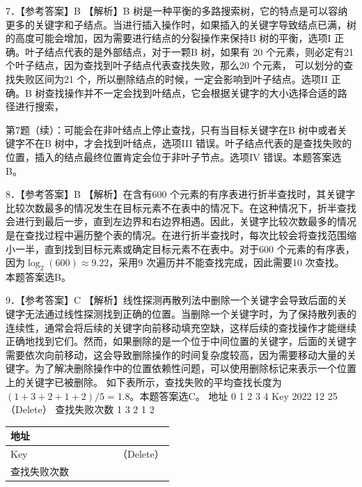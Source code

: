 \documentclass[UTF8,11pt]{ctexart}
\begin{document}
7．【参考答案】B 【解析】B 树是一种平衡的多路搜索树，它的特点是可以容纳更多的关键字和子结点。当进行插入操作时，如果插入的关键字导致结点已满，树的高度可能会增加，因为需要进行结点的分裂操作来保持B 树的平衡，选项I 正确。叶子结点代表的是外部结点，对于一颗B 树，如果有 20 个元素，则必定有21 个叶子结点，因为查找到叶子结点代表查找失败，那么20 个元素， 可以划分的查找失败区间为21 个，所以删除结点的时候，一定会影响到叶子结点。选项II 正确。B 树查找操作并不一定会找到叶结点，它会根据关键字的大小选择合适的路径进行搜索，


第7题（续）：可能会在非叶结点上停止查找，只有当目标关键字在B 树中或者关键字不在B 树中，才会找到叶结点，选项III 错误。叶子结点代表的是查找失败的位置，插入的结点最终位置肯定会位于非叶子节点。选项IV 错误。本题答案选B。


8．【参考答案】B 【解析】在含有600 个元素的有序表进行折半查找时，其关键字比较次数最多的情况发生在目标元素不在表中的情况下。在这种情况下，折半查找会进行到最后一步，直到左边界和右边界相遇。因此，关键字比较次数最多的情况是在查找过程中遍历整个表的情况。在进行折半查找时，每次比较会将查找范围缩小一半，直到找到目标元素或确定目标元素不在表中。对于600 个元素的有序表，因为\(\displaystyle \log_2(600)\approx9.22\)，采用9 次遍历并不能查找完成，因此需要10 次查找。 本题答案选B。


9．【参考答案】C 【解析】线性探测再散列法中删除一个关键字会导致后面的关键字无法通过线性探测找到正确的位置。当删除一个关键字时，为了保持散列表的连续性，通常会将后续的关键字向前移动填充空缺，这样后续的查找操作才能继续正确地找到它们。然而，如果删除的是一个位于中间位置的关键字，后面的关键字需要依次向前移动，这会导致删除操作的时间复杂度较高，因为需要移动大量的关键字。为了解决删除操作中的位置依赖性问题，可以使用删除标记来表示一个位置上的关键字已被删除。 如下表所示，查找失败的平均查找长度为\(\displaystyle (1+3+2+1+2)/5=1.8\)。本题答案选C。 地址 0 1 2 3 4 Key 2022 12 25（Delete） 查找失败次数 1 3 2 1 2


\begin{center}\begin{adjustbox}{max width=\linewidth}\begin{tabular}{|>{\raggedright\arraybackslash}p{\dimexpr(\linewidth-12\tabcolsep-7\arrayrulewidth)/6\relax}|>{\raggedright\arraybackslash}p{\dimexpr(\linewidth-12\tabcolsep-7\arrayrulewidth)/6\relax}|>{\raggedright\arraybackslash}p{\dimexpr(\linewidth-12\tabcolsep-7\arrayrulewidth)/6\relax}|>{\raggedright\arraybackslash}p{\dimexpr(\linewidth-12\tabcolsep-7\arrayrulewidth)/6\relax}|>{\raggedright\arraybackslash}p{\dimexpr(\linewidth-12\tabcolsep-7\arrayrulewidth)/6\relax}|>{\raggedright\arraybackslash}p{\dimexpr(\linewidth-12\tabcolsep-7\arrayrulewidth)/6\relax}|}\hline
地址 & 0 & 1 & 2 & 3 & 4\\\hline
Key &  & 2022 & 12 &  & 25（Delete）\\\hline
查找失败次数 & 1 & 3 & 2 & 1 & 2\\\hline\end{tabular}\end{adjustbox}\end{center}
\end{document}
